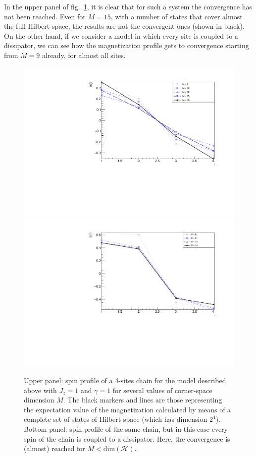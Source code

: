 In the upper panel of fig.~\ref{fig:4sites_LM_convergenceIncreasingM}, it is clear that for such a system the convergence has not been reached. Even for $M = 15$, with a number of states that cover almost the full Hilbert space, the results are not the convergent ones (shown in black). On the other hand, if we consider a model in which every site is coupled to a dissipator, we can see how the magnetization profile gets to convergence starting from $M = 9$ already, for almost all sites. 

\begin{figure}[H]
    \centering
    \includegraphics[scale=0.5]{Figures/4sites/4sites_LM_convergenceIncreasingM.pdf}
    \includegraphics[scale=0.5]{Figures/4sites/4sites_totalDissipators.pdf}
    \captionsetup{width=1.\linewidth}
    \caption{Upper panel: spin profile of a 4-sites chain for the model described above with $J_z=1$ and $\gamma = 1 $ for several values of corner-space dimension $M$. The black markers and lines are those representing the expectation value of the magnetization calculated by means of a complete set of states of Hilbert space (which has dimension $2^4$).
    Bottom panel: spin profile of the same chain, but in this case every spin of the chain is coupled to a dissipator. Here, the convergence is (almost) reached for $M<\text{dim}(\mathcal{H})$.}
    \label{fig:4sites_LM_convergenceIncreasingM}
\end{figure}

